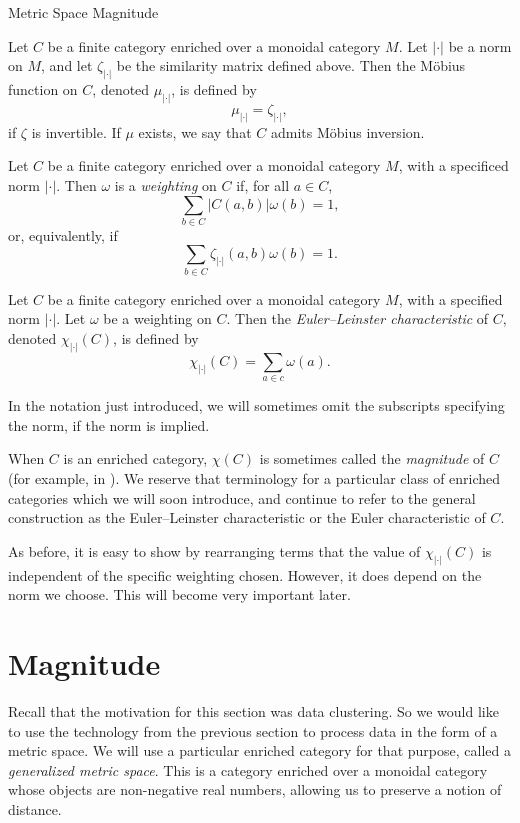 \documentclass[12pt]{pom_thesis}
\begin{document}
\begin{chapter}{Metric Space Magnitude}
\begin{defn}
Let $C$ be a finite category enriched over a monoidal category $M$. Let $|\cdot|$ be a norm on $M$, and let $\zeta_{|\cdot|}$ be the similarity matrix defined above. Then the M\"obius function on $C$, denoted $\mu_{|\cdot|}$, is defined by 
\[
\mu_{|\cdot|} = \zeta_{|\cdot|},
\]
if $\zeta$ is invertible. If $\mu$ exists, we say that $C$ admits M\"obius inversion.
\end{defn}

\begin{defn}
Let $C$ be a finite category enriched over a monoidal category $M$, with a specificed norm $|\cdot|$. Then $\omega$ is a \emph{weighting} on $C$ if, for all $a \in C$, 
\[
\sum_{b \in C}|C(a,b)|\omega(b) = 1,
\]
or, equivalently, if
\[
\sum_{b \in C}\zeta_{|\cdot|}(a,b)\omega(b) = 1.
\]
\end{defn}

\begin{defn}
Let $C$ be a finite category enriched over a monoidal category $M$, with a specified norm $|\cdot|$. Let $\omega$ be a weighting on $C$. Then the \emph{Euler--Leinster characteristic} of $C$, denoted $\chi_{|\cdot|}(C)$, is defined by
\[
\chi_{|\cdot|}(C) = \sum_{a \in c} \omega(a).
\]
\end{defn}
In the notation just introduced, we will sometimes omit the subscripts specifying the norm, if the norm is implied.
\begin{rmk}
When $C$ is an enriched category, $\chi(C)$ is sometimes called the \emph{magnitude} of $C$ (for example, in \cite{Lein4}). We reserve that terminology for a particular class of enriched categories which we will soon introduce, and continue to refer to the general construction as the Euler--Leinster characteristic or the Euler characteristic of $C$.
\end{rmk}
\begin{rmk}
As before, it is easy to show by rearranging terms that the value of $\chi_{|\cdot|}(C)$ is independent of the specific weighting chosen. However, it does depend on the norm we choose. This will become very important later.
\end{rmk}

\section{Magnitude}
Recall that the motivation for this section was data clustering. So we would like to use the technology from the previous section to process data in the form of a metric space. We will use a particular enriched category for that purpose, called a \emph{generalized metric space}. This is a category enriched over a monoidal category whose objects are non-negative real numbers, allowing us to preserve a notion of distance.  


\end{chapter}
\end{document}
